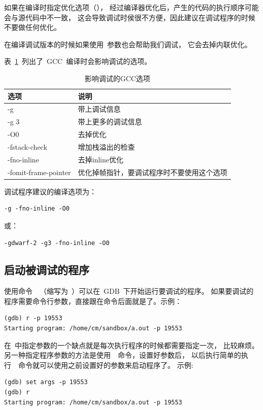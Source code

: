 如果在编译时指定优化选项（），
经过编译器优化后，产生的代码的执行顺序可能会与源代码中不一致，
这会导致调试时侯很不方便，因此建议在调试程序的时候不要做任何优化。

在编译调试版本的时候如果使用~参数也会帮助我们调试，
它会去掉内联优化。

表~\ref{tab:gdb_gcc_opt}~列出了~GCC~编译时会影响调试的选项。

\begin{table}[!bhp]
\begin{tabular}{l|l}
\hline
\hline
选项 & 说明 \\
\hline
-g		&   带上调试信息        \\
-g  3   &   带上更多的调试信息  \\
-O0		&   去掉优化            \\
-fstack-check	&   增加栈溢出的检查    \\
-fno-inline     &   去掉inline优化      \\
-fomit-frame-pointer    &   优化掉帧指针，要调试程序时不要使用这个选项 \\
\hline
\hline
\end{tabular}
\caption{影响调试的GCC选项} \label{tab:gdb_gcc_opt}
\end{table}

调试程序建议的编译选项为：
\begin{lstlisting}
-g -fno-inline -O0
\end{lstlisting}
或：
\begin{lstlisting}
-gdwarf-2 -g3 -fno-inline -O0
\end{lstlisting}

\subsection{启动被调试的程序}
使用命令~~（缩写为~）可以在~GDB~下开始运行要调试的程序。
如果要调试的程序需要命令行参数，直接跟在命令后面就是了。示例：
\begin{lstlisting}
(gdb) r -p 19553
Starting program: /home/cm/sandbox/a.out -p 19553
\end{lstlisting}

在~中指定参数的一个缺点就是每次执行程序的时候都需要指定一次，
比较麻烦。
另一种指定程序参数的方法是使用~~命令，设置好参数后，
以后执行简单的执行~~命令就可以使用之前设置好的参数来启动程序了。
示例:
\begin{lstlisting}
(gdb) set args -p 19553
(gdb) r
Starting program: /home/cm/sandbox/a.out -p 19553
\end{lstlisting}

